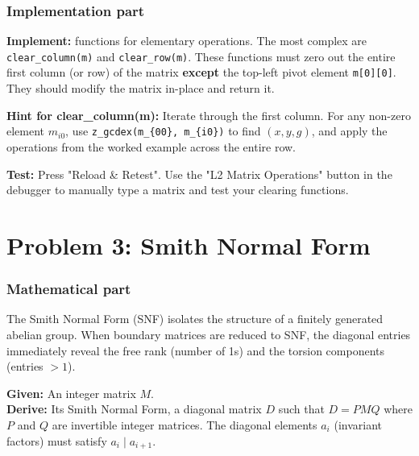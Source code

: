 \documentclass[11pt]{article}
\begin{document}
\subsubsection*{Implementation part}
\textbf{Implement:} functions for elementary operations. The most complex are \lstinline|clear_column(m)| and \lstinline|clear_row(m)|. These functions must zero out the entire first column (or row) of the matrix \textbf{except} the top-left pivot element \lstinline|m[0][0]|. They should modify the matrix in-place and return it.

\textbf{Hint for clear\_column(m):} Iterate through the first column. For any non-zero element $m_{i0}$, use \lstinline|z_gcdex(m_{00}, m_{i0})| to find $(x, y, g)$, and apply the operations from the worked example across the entire row.

\textbf{Test:} Press "Reload \& Retest". Use the "L2 Matrix Operations" button in the debugger to manually type a matrix and test your clearing functions.









\section*{Problem 3: Smith Normal Form}

\subsubsection*{Mathematical part}
The Smith Normal Form (SNF) isolates the structure of a finitely generated abelian group. When boundary matrices are reduced to SNF, the diagonal entries immediately reveal the free rank (number of 1s) and the torsion components (entries $> 1$).

\textbf{Given:} An integer matrix $M$. \\
\textbf{Derive:} Its Smith Normal Form, a diagonal matrix $D$ such that $D = P M Q$ where $P$ and $Q$ are invertible integer matrices. The diagonal elements $a_i$ (invariant factors) must satisfy $a_i \mid a_{i+1}$.
\end{document}
